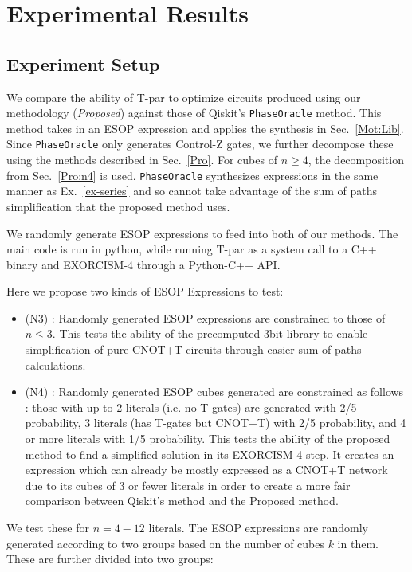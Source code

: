 \section{Experimental Results}
\label{Exp}
\subsection{Experiment Setup}
\label{Exp:Set}
We compare the ability of T-par to optimize circuits produced using our methodology ({\it Proposed}) against those
of Qiskit's \texttt{PhaseOracle} method. This method takes in an ESOP expression and applies the synthesis in
Sec.~\ref{Mot:Lib}. Since \texttt{PhaseOracle} only generates Control-Z gates,
we further decompose these using the methods described in Sec.~\ref{Pro}.  For cubes of $n \geq 4$,
the decomposition from Sec.~\ref{Pro:n4} is used. \texttt{PhaseOracle} synthesizes expressions in the same
manner as Ex.~\ref{ex-series} and so cannot take advantage of the sum of paths simplification that
the proposed method uses.

We randomly generate ESOP expressions to feed into both of our methods. The main code is run in python,
while running T-par as a system call to a C++ binary and EXORCISM-4 through a Python-C++ API.

Here we propose two kinds of ESOP Expressions to test:

\begin{itemize}
\item (N3) : Randomly generated ESOP expressions are constrained to those of $n \leq 3$. This tests the
  ability of the precomputed 3bit library to enable simplification of pure CNOT+T circuits through easier
  sum of paths calculations.
\item (N4) : Randomly generated ESOP cubes generated are constrained as follows :
  those with up to 2 literals (i.e. no T gates)  are generated with 2/5 probability,
  3 literals (has T-gates but CNOT+T) with 2/5 probability, and 4 or more literals with 1/5 probability.
  This tests the ability of the proposed method to find a simplified solution in its EXORCISM-4 step.
  It creates an expression which can already be mostly expressed as a CNOT+T network due to its cubes of
  3 or fewer literals in order to create a more fair comparison between Qiskit's method and the Proposed
  method.
\end{itemize}

We test these for $n=4-12$ literals. The ESOP expressions are randomly generated according to two groups
based on the number of cubes $k$ in them. These are further divided into two groups:

